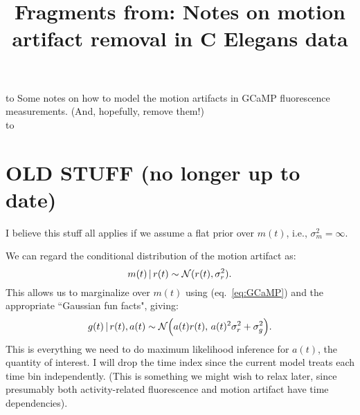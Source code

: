 \documentclass[11pt]{article}
\renewcommand{\eqref}[1]{eq.~\ref{eq:#1}}
\newcommand{\vr}{\sigma^2_r}
\newcommand{\vm}{\sigma^2_m}
\newcommand{\vg}{\sigma^2_g}
\begin{document}



\title{Fragments from: Notes on motion artifact removal in C Elegans data}

\maketitle

\hbox to \textwidth{\hrulefill} 
\vspace{-.1in}
Some notes on how to model the motion artifacts
in GCaMP fluorescence measurements. (And, hopefully, remove them!) \\
\hbox to \textwidth{\hrulefill}

\vspace{.5in}


\section{OLD STUFF (no longer up to date)}

I believe this stuff all applies if we assume a flat prior over
$m(t)$, i.e., $\vm = \infty$.

We can regard the conditional distribution of the motion artifact as:
\begin{equation}
m(t)\, |\, r(t)  \sim \Nrm(r(t), \vr).
\end{equation}
This allows us to marginalize over $m(t)$ using (\eqref{GCaMP}) and
the appropriate ``Gaussian fun facts", giving:
\begin{equation}
g(t)\, |\, r(t),a(t)  \sim \Nrm\Big(a(t)r(t),\, a(t)^2 \vr + \vg\Big).
\end{equation}
This is everything we need to do maximum likelihood inference for
$a(t)$, the quantity of interest.  I will drop the time index since
the current model treats each time bin independently.  (This is
something we might wish to relax later, since presumably both
activity-related fluorescence and motion artifact have time
dependencies).  
\end{document}
